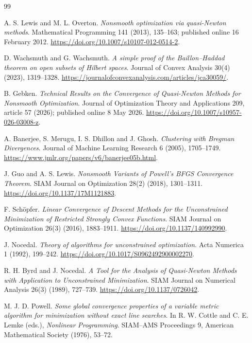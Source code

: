 \begin{thebibliography}{99}

 A. S. Lewis and M. L. Overton. \emph{Nonsmooth optimization via quasi-Newton methods}. Mathematical Programming 141 (2013), 135--163; published online 16 February 2012. \url{https://doi.org/10.1007/s10107-012-0514-2}.

 D. Wachsmuth and G. Wachsmuth. \emph{A simple proof of the Baillon--Haddad theorem on open subsets of Hilbert spaces}. Journal of Convex Analysis 30(4) (2023), 1319--1328. \url{https://journalofconvexanalysis.com/articles/jca30059/}.

 B. Gebken. \emph{Technical Results on the Convergence of Quasi-Newton Methods for Nonsmooth Optimization}. Journal of Optimization Theory and Applications 209, article 57 (2026); published online 8 May 2026. \url{https://doi.org/10.1007/s10957-026-03008-z}.

 A. Banerjee, S. Merugu, I. S. Dhillon and J. Ghosh. \emph{Clustering with Bregman Divergences}. Journal of Machine Learning Research 6 (2005), 1705--1749. \url{https://www.jmlr.org/papers/v6/banerjee05b.html}.

 J. Guo and A. S. Lewis. \emph{Nonsmooth Variants of Powell's BFGS Convergence Theorem}. SIAM Journal on Optimization 28(2) (2018), 1301--1311. \url{https://doi.org/10.1137/17M1121883}.

 F. Sch\"opfer. \emph{Linear Convergence of Descent Methods for the Unconstrained Minimization of Restricted Strongly Convex Functions}. SIAM Journal on Optimization 26(3) (2016), 1883--1911. \url{https://doi.org/10.1137/140992990}.

 J. Nocedal. \emph{Theory of algorithms for unconstrained optimization}. Acta Numerica 1 (1992), 199--242. \url{https://doi.org/10.1017/S0962492900002270}.

 R. H. Byrd and J. Nocedal. \emph{A Tool for the Analysis of Quasi-Newton Methods with Application to Unconstrained Minimization}. SIAM Journal on Numerical Analysis 26(3) (1989), 727--739. \url{https://doi.org/10.1137/0726042}.

 M. J. D. Powell. \emph{Some global convergence properties of a variable metric algorithm for minimization without exact line searches}.
In R. W. Cottle and C. E. Lemke (eds.), \emph{Nonlinear Programming}. SIAM--AMS Proceedings 9, American Mathematical Society (1976), 53--72.


\end{thebibliography}

